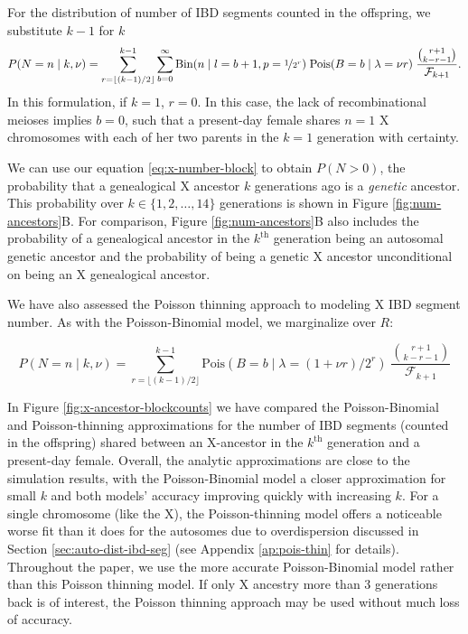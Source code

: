 \documentclass[11pt]{article}
\begin{document}
For the distribution of number of IBD segments counted in the offspring, we
substitute $k-1$ for $k$
\begin{equation}
  \label{eq:x-number-block}
  P(N=n \;|\; k, \nu) = \sum_{r=\lfloor (k-1)/2 \rfloor}^{k-1} \sum_{b=0}^\infty \text{Bin}(n \;|\; l=b+1, p=\nicefrac{1}{2^r}) \; \text{Pois}(B=b \;|\; \lambda=\nu r) \; \frac{{r+1 \choose k-r-1}}{\mathcal{F}_{k+1}}.
\end{equation}
%
In this formulation, if $k=1$, $r = 0$. In this case, the lack of
recombinational meioses implies $b=0$, such that a present-day female shares
$n=1$ X chromosomes with each of her two parents in the $k=1$ generation with
certainty. 

We can use our equation \eqref{eq:x-number-block} to obtain $P(N > 0)$, the
probability that a genealogical X ancestor $k$ generations ago is a
\emph{genetic} ancestor. This probability over $k \in \{1, 2, \ldots, 14\}$
generations is shown in Figure \ref{fig:num-ancestors}B. For comparison, Figure
\ref{fig:num-ancestors}B also includes the probability of a genealogical
ancestor in the $k^\text{th}$ generation being an autosomal genetic ancestor
and the probability of being a genetic X ancestor unconditional on being an X
genealogical ancestor. 

We have also assessed the Poisson thinning approach to modeling X IBD segment
number. As with the Poisson-Binomial model, we marginalize over $R$:

\begin{equation}
  \label{eq:x-number-block-thinned}
  P(N=n \;|\; k, \nu) = \sum_{r=\lfloor (k-1)/2 \rfloor}^{k-1} \text{Pois}(B=b \;|\; \lambda=(1 + \nu r)/2^r) \; \frac{{r+1 \choose k-r-1}}{\mathcal{F}_{k+1}}
\end{equation}

In Figure \ref{fig:x-ancestor-blockcounts} we have compared the
Poisson-Binomial and Poisson-thinning approximations for the number of IBD
segments (counted in the offspring) shared between an X-ancestor in the
$k^\text{th}$ generation and a present-day female. Overall, the analytic
approximations are close to the simulation results, with the Poisson-Binomial
model a closer approximation for small $k$ and both models' accuracy improving
quickly with increasing $k$.  For a single chromosome (like the X), the
Poisson-thinning model offers a noticeable worse fit than it does for the
autosomes due to overdispersion discussed in Section
\ref{sec:auto-dist-ibd-seg} (see Appendix \ref{ap:pois-thin} for details).
Throughout the paper, we use the more accurate Poisson-Binomial model rather
than this Poisson thinning model. If only X ancestry more than 3 generations
back is of interest, the Poisson thinning approach may be used without much
loss of accuracy.
\end{document}
